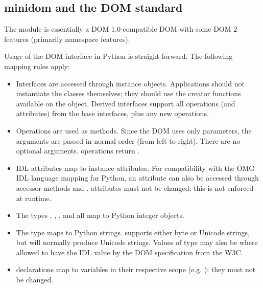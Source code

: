 


\subsection{minidom and the DOM standard \label{minidom-and-dom}}

The  module is essentially a DOM
1.0-compatible DOM with some DOM 2 features (primarily namespace
features).

Usage of the DOM interface in Python is straight-forward.  The
following mapping rules apply:

\begin{itemize}
\item Interfaces are accessed through instance objects. Applications
      should not instantiate the classes themselves; they should use
      the creator functions available on the  object.
      Derived interfaces support all operations (and attributes) from
      the base interfaces, plus any new operations.

\item Operations are used as methods. Since the DOM uses only
       parameters, the arguments are passed in normal
      order (from left to right).   There are no optional
      arguments.  operations return .

\item IDL attributes map to instance attributes. For compatibility
      with the OMG IDL language mapping for Python, an attribute
       can also be accessed through accessor methods
       and .  
      attributes must not be changed; this is not enforced at
      runtime.

\item The types , , , and  all map to Python integer
      objects.

\item The type  maps to Python strings.
       supports either byte or Unicode
      strings, but will normally produce Unicode strings.  Values
      of type  may also be  where allowed
      to have the IDL  value by the DOM specification from
      the W3C.

\item {} declarations map to variables in their
      respective scope
      (e.g. );
      they must not be changed.


\end{itemize}
